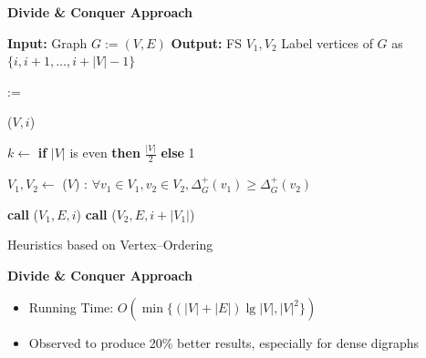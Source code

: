 \documentclass{beamer}
\begin{document}
\begin{frame}[fragile, shrink=7.5]
    \vspace{0.3em}
    \textbf{\Large Divide \& Conquer Approach}
    \vspace{0.5em}

    {\fontsize{3pt}{4pt}\selectfont
    \begin{algorithm}[H]

        \caption*{\textit{Eades\_DAG}} 
        
        \begin{algorithmic}[1]
            \State \textbf{Input:} Graph $G := (V, E)$
            \State \textbf{Output:} FS $V_1, V_2$
            \Statex
            \State Label vertices of $G$ as $\{i, i + 1, \dots, i + |V| - 1\}$

            \Statex
             :=

                    \State {}($V, i$)
                    \State \Return
                \EndIf
                \Statex

                \State $k \gets$ \textbf{if} $|V|$ is even \textbf{then} $\frac{|V|}{2}$ \textbf{else} 1

                \State $V_1, V_2 \gets $ ($V$) : $\forall v_1 \in V_1, v_2 \in V_2, \Delta^+_G(v_1) \geq \Delta^+_G(v_2)$

                \Statex

                \State \textbf{call} ($V_1, E, i$)
                \State \textbf{call} ($V_2, E, i + |V_1|$)

            \EndProcedure
        \end{algorithmic}
    \end{algorithm}
    }
\end{frame}


\begin{frame}{Heuristics based on Vertex–Ordering}
    
    \textbf{Divide \& Conquer Approach}

    \begin{itemize}
        
        \item Running Time: $O(\min\{(|V| + |E|)\lg|V|, |V|^2\})$
        \item Observed to produce 20\% better results, especially for dense digraphs

    \end{itemize}

\end{frame}
\end{document}
